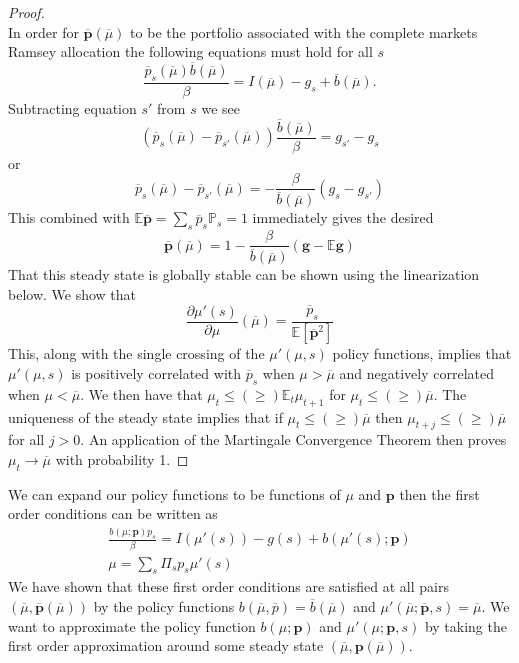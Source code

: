 \documentclass[12pt]{article}
\newcommand{\EE}{\mathbb E}
\newcommand{\pbar}{{\overline p}}
\newcommand{\bbar}{{\overline b}}
\newcommand{\mubar}{{\overline \mu}}
\begin{document}
\begin{appendix}
\begin{proof}
\[\]  In order for $\bm \pbar(\mubar)$ to be the portfolio associated with the complete markets Ramsey allocation the following equations must hold for all $s$
\[
	\frac{\pbar_s(\mubar)\bbar(\mubar)}{\beta} = I(\mubar) - g_s + \bbar(\mubar). 
\]Subtracting equation $s'$ from $s$ we see
\[
	(\overline p_s(\mubar)-\pbar_{s'}(\mubar))\frac{\bbar(\mubar)}{\beta} = g_{s'}-g_s 
\]or
\[
	\pbar_s(\mubar)-\pbar_{s'}(\mubar) = -\frac{\beta}{\overline b(\mubar)}(g_s-g_{s'})
\]This combined with $\EE\bm\pbar = \sum_{s}\pbar_s\mathbb P_s = 1$ immediately gives the desired
\begin{equation}
	\bm\pbar(\mubar) = 1-\frac{\beta}{\bbar(\mubar)}\left(\bm g-\EE\bm g\right)
\end{equation}  That this steady state is globally stable can be shown using the linearization below.  We show that 
\[
	\frac{\partial \mu'(s)}{\partial \mu}(\mubar) = \frac{\pbar_s}{\EE[\bm\pbar^2]}
\]  This, along with the single crossing of the $\mu'(\mu,s)$ policy functions, implies that $\mu'(\mu,s)$ is positively correlated with $\pbar_s$ when $\mu >\mubar$ and negatively correlated when $\mu <\mubar$.  We then have that $\mu_t \leq (\geq)\EE_t\mu_{t+1}$ for $\mu_t \leq (\geq)\mubar$.  The uniqueness of the steady state implies that if $\mu_t \leq (\geq) \mubar$ then $\mu_{t+j} \leq (\geq) \mubar$ for all $j >0$.  An application of the Martingale Convergence Theorem then proves $\mu_t \rightarrow\mubar$ with probability 1.
\end{proof}  We can expand our policy functions to be functions of $\mu$ and $\bm p$ then the first order conditions can be written as 
\begin{align*}
	\frac{b(\mu;\bm p)p_s}{\beta} = I(\mu'(s)) - g(s) + b(\mu'(s);\bm p)\\
	\mu = \sum_{s}\Pi_s p_s\mu'(s)
\end{align*}  We have shown that these first order conditions are satisfied at all pairs $(\mubar,\bm \pbar(\mubar))$ by the policy functions $b(\mubar,\pbar) = \bbar(\mubar)$ and $\mu'(\mubar;\bm \pbar,s) = \mubar$.  We want to approximate the policy function $b(\mu;\bm p)$ and $\mu'(\mu;\bm p,s)$ by taking the first order approximation around some steady state $(\mubar,\bm p(\mubar))$.


\end{appendix}
\end{document}
